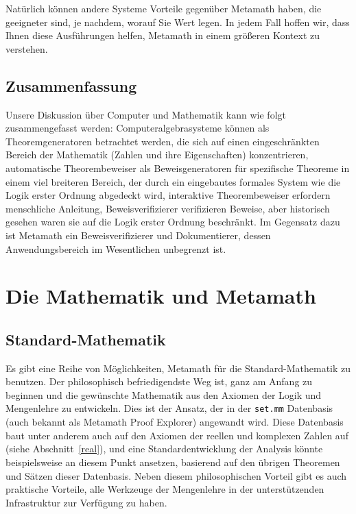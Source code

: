 Natürlich können andere Systeme Vorteile gegenüber Metamath haben, die geeigneter sind, je nachdem, worauf Sie Wert legen.
In jedem Fall hoffen wir, dass Ihnen diese Ausführungen helfen, Metamath in einem größeren Kontext zu verstehen.

\subsection{Zusammenfassung}\label{computers-summary}

Unsere Diskussion über Computer und Mathematik kann wie folgt zusammengefasst werden: Computeralgebrasysteme können als Theoremgeneratoren betrachtet werden, die sich auf einen eingeschränkten Bereich der Mathematik (Zahlen und ihre Eigenschaften) konzentrieren, automatische Theorembeweiser als Beweisgeneratoren für spezifische Theoreme in einem viel breiteren Bereich, der durch ein eingebautes formales System wie die Logik erster Ordnung abgedeckt wird, interaktive Theorembeweiser erfordern menschliche Anleitung, Beweisverifizierer verifizieren Beweise, aber historisch gesehen waren sie auf die Logik erster Ordnung beschränkt.
Im Gegensatz dazu ist Metamath ein Beweisverifizierer und Dokumentierer, dessen Anwendungsbereich im Wesentlichen unbegrenzt ist.

\section{Die Mathematik und Metamath}

\subsection{Standard-Mathematik}

Es gibt eine Reihe von Möglichkeiten, Metamath für die Standard-Mathematik zu benutzen.  Der philosophisch befriedigendste Weg ist, ganz am Anfang zu beginnen und die gewünschte Mathematik aus den Axiomen der Logik und Mengenlehre zu entwickeln.  Dies ist der Ansatz, der in der
\texttt{set.mm}%
Datenbasis (auch bekannt als Metamath Proof Explorer) angewandt wird.
Diese Datenbasis baut unter anderem auch auf den Axiomen der reellen und komplexen Zahlen auf (siehe Abschnitt~\ref{real}), und eine Standardentwicklung der Analysis könnte beispielsweise an diesem Punkt ansetzen, basierend auf den übrigen Theoremen und Sätzen dieser Datenbasis.
Neben diesem philosophischen Vorteil gibt es auch praktische Vorteile, alle Werkzeuge der Mengenlehre in der unterstützenden Infrastruktur zur Verfügung zu haben.

